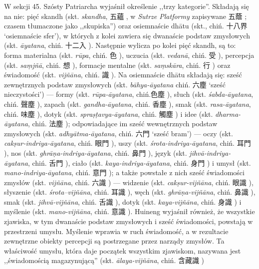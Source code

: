 W sekcji 45. Szósty Patriarcha wyjaśnił określenie ,,trzy kategorie''.
Składają się na nie: pięć skandh (skt. \textit{skandha}, 五蘊 , w \textit{Sutrze Platformy} zapisywane 五蔭 ; czasem tłumaczone jako ,,skupiska'') oraz osiemnaście dhātu (skt., chiń. 十八界  `osiemnaście sfer'), w których z kolei zawiera się dwanaście podstaw zmysłowych (skt. \nohyphens{\itshape āyatana}, chiń. 十二入 ).
Następnie wylicza po kolei pięć skandh, są to: forma materialna (skt. \textit{rūpa}, chiń. 色 ), uczucia (skt. \textit{vedanā}, chiń. 受 ), percepcja (skt. \textit{sa\d{m}jñā}, chiń. 想 ), formacje mentalne (skt. \textit{sa\d{m}skāra}, chiń. 行 ) oraz świadomość (skt. \textit{vijñāna}, chiń. 識 ).
Na osiemnaście dhātu składają się: sześć zewnętrznych podstaw zmysłowych (skt. \textit{bāhya-āyatana} chiń. 六塵 `sześć nieczystości')
--- formy (skt. \textit{rūpa-āyatana}, chiń.色塵 ), słuch (skt. \textit{śabda-āyatana}, chiń. 聲塵 ), zapach (skt. \textit{gandha-āyatana}, chiń. 香塵 ), smak (skt. \textit{rasa-āyatana}, chiń. 味塵 ), dotyk (skt. \textit{spra\d{s}\d{t}avya-āyatana}, chiń. 觸塵 ) i idee (skt. \textit{dharma-āyatana}, chiń. 法塵 );
odpowiadające im sześć wewnętrznych podstaw zmysłowych (skt. \textit{adhyātma-āyatana}, chiń. 六門  `sześć bram') --- oczy (skt. \textit{cak\d{s}ur-indriya-āyatana}, chiń. 眼門 ), uszy (skt. \textit{śrota-indriya-āyatana}, chiń. 耳門 ), nos (skt. \textit{ghrā\d{n}a-indriya-āyatana}, chiń. 鼻門 ), język (skt. \textit{jihvā-indriya-āyatana}, chiń. 舌門 ), ciało (skt. \textit{kaya-indriya-āyatana}, chiń. 身門 ) i umysł (skt. \textit{mano-indriya-āyatana}, chiń. 意門 );
a także powstałe z nich sześć świadomości zmysłów (skt. \textit{vijñāna}, chiń. 六識 ) --- widzenie (skt. \textit{cak\d{s}ur-vijñāna}, chiń. 眼識 ), słyszenie (skt. \textit{śrota--vijñāna}, chiń. 耳識 ), węch (skt. \textit{ghrā\d{n}a-vijñāna}, chiń. 鼻識 ), smak (skt. \textit{jihvā-vijñāna}, chiń. 舌識 ), dotyk (skt. \textit{kaya-vijñāna}, chiń. 身識 ) i myślenie (skt. \textit{mano-vijñāna}, chiń. 意識 ).
Huineng wyjaśnił również, że wszystkie zjawiska, w tym dwanaście podstaw zmysłowych i sześć świadomości, powstają w przestrzeni umysłu.
Myślenie wprawia w ruch świadomość, a w rezultacie zewnętrzne obiekty percepcji są postrzegane przez narządy zmysłów.
Ta właściwość umysłu, która daje początek wszystkim zjawiskom, nazywana jest ,,świadomością magazynującą'' (skt. \textit{ālaya-vijñāna}, chiń. 含藏識 )\ibid

